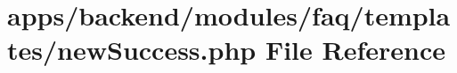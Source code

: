 \hypertarget{backend_2modules_2faq_2templates_2new_success_8php}{\section{apps/backend/modules/faq/templates/new\-Success.php File Reference}
\label{backend_2modules_2faq_2templates_2new_success_8php}
}
